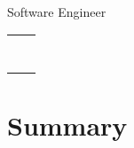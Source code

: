 \documentclass[11pt,a4paper]{article}
\newcommand{\contactItem}[2]{
    {\color{secondary}\small#1} & #2 \\
}
\begin{document}
\begin{center}
    {\Huge\textbf{\MakeUppercase{\ProfileName}}}\\[0.5em]
    {\color{secondary}\large Software Engineer}\\[1em]
\end{center}

\begin{tabular}{ll}
    \contactItem{\faPhone}{\ProfilePhone}
    \contactItem{\faEnvelope}{\ProfileEmail}
    \contactItem{\faLinkedin}{\ProfileLinkedIn}
    \contactItem{\faGlobe}{\ProfileWebsite}
    \contactItem{\faGithub}{\ProfileGithub}
    \contactItem{\faMapMarker}{\ProfileLocation}
    \contactItem{\faFlag}{\ProfileCitizenship}
\end{tabular}

\section{Summary}
\ProfileGeneral
\end{document}
